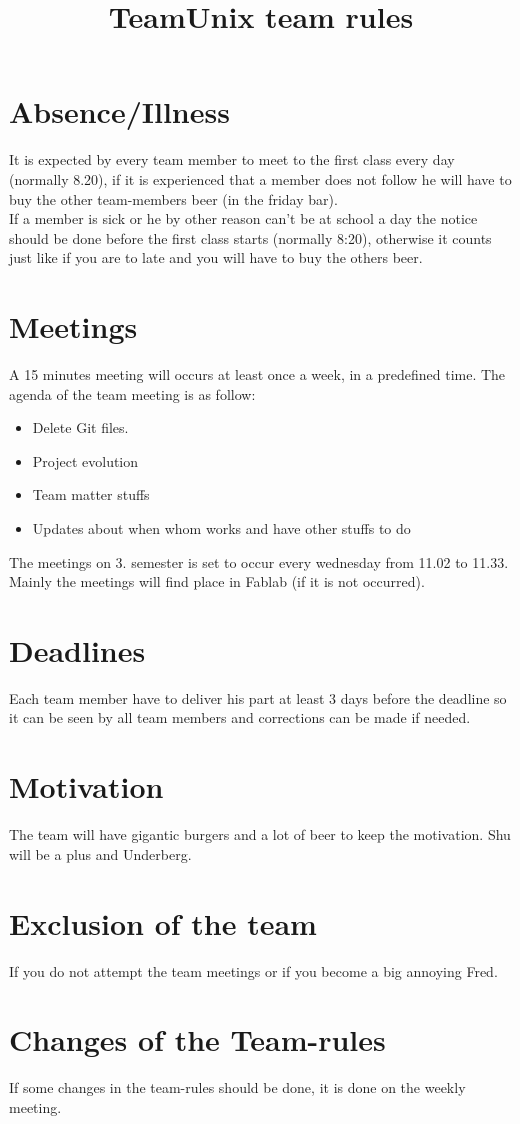 \documentclass[10pt,a4paper]{article}
\title{TeamUnix team rules}
\begin{document}
\maketitle

\section{Absence/Illness}
It is expected by every team member to meet to the first class every day (normally 8.20), 
if it is experienced that a member does not follow he will have to buy the other team-members beer (in the friday bar). 
\\If a member is sick or he by other reason can't be at school a day the notice should be done before the first class starts (normally 8:20), 
otherwise it counts just like if you are to late and you will have to buy the others beer.
\section{Meetings}
A 15 minutes meeting will occurs at least once a week, in a predefined time. The agenda of the team meeting is as follow: 
\begin{itemize}
	\item	 Delete Git files.
	\item  Project evolution
	\item Team matter stuffs
	\item Updates about when whom works and have other stuffs to do
\end{itemize}
The meetings on 3. semester is set to occur every wednesday from 11.02 to 11.33. Mainly the meetings will find place in Fablab (if it is not occurred). 
\section{Deadlines}
Each team member have to deliver his part at least 3 days before the deadline so it can be seen by all team members and corrections can be made if needed.
\section{Motivation}
The team will have gigantic burgers and a lot of beer to keep the motivation. Shu will be a plus and Underberg. 
\section{Exclusion of the team}
If you do not attempt the team meetings or if you become a big annoying Fred.
\section{Changes of the Team-rules}
If some changes in the team-rules should be done, it is done on the weekly meeting.
\end{document}
